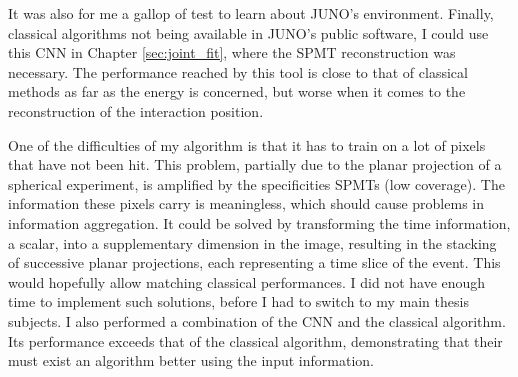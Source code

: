 \documentclass[../main.tex]{subfiles}
\begin{document}
It was also for me a gallop of test to learn about JUNO's environment. Finally, classical algorithms not being available in JUNO's public software, I could use this CNN in Chapter \ref{sec:joint_fit}, where the SPMT reconstruction was necessary. The performance reached by this tool is close to that of classical methods as far as the energy is concerned, but worse when it comes to the reconstruction of the interaction position.

One of the difficulties of my algorithm is that it has to train on a lot of pixels that have not been hit. This problem, partially due to the planar projection of a spherical experiment, is amplified by the specificities SPMTs (low coverage). The information these pixels carry is meaningless, which should cause problems in information aggregation. It could be solved by transforming the time information, a scalar, into a supplementary dimension in the image, resulting in the stacking of successive planar projections, each representing a time slice of the event. This would hopefully allow matching classical performances. I did not have enough time to implement such solutions, before I had to switch to my main thesis subjects. I also performed a combination of the CNN and the classical algorithm. Its performance exceeds that of the classical algorithm, demonstrating that their must exist an algorithm better using the input information.

\hfill
\end{document}
